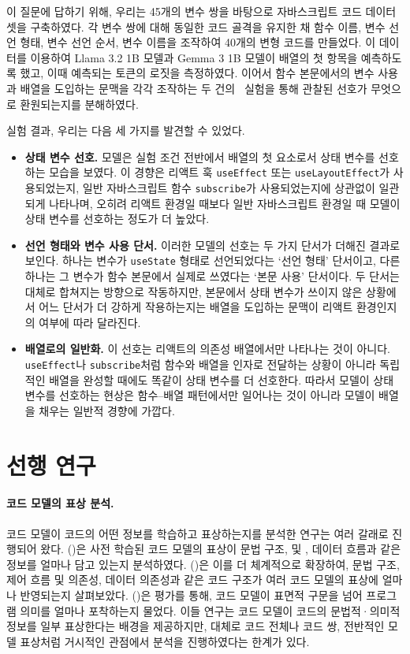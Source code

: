 \documentclass[11pt]{article}
\renewcommand{\citet}[1]{\citeauthor{#1}(\citeyear{#1})}
\begin{document}
이 질문에 답하기 위해, 우리는 45개의 변수 쌍을 바탕으로 자바스크립트 코드 데이터셋을 구축하였다.
각 변수 쌍에 대해 동일한 코드 골격을 유지한 채 함수 이름, 변수 선언 형태, 변수 선언 순서, 변수 이름을 조작하여 40개의 변형 코드를 만들었다.
이 데이터를 이용하여 Llama 3.2 1B 모델과 Gemma 3 1B 모델이 배열의 첫 항목을 예측하도록 했고, 이때 예측되는 토큰의 로짓을 측정하였다.
이어서 함수 본문에서의 변수 사용과 배열을 도입하는 문맥을 각각 조작하는 두 건의 ~실험을 통해 관찰된 선호가 무엇으로 환원되는지를 분해하였다.

실험 결과, 우리는 다음 세 가지를 발견할 수 있었다.
\begin{itemize}
  \item \textbf{상태 변수 선호.}
    모델은 실험 조건 전반에서 배열의 첫 요소로서 상태 변수를 선호하는 모습을 보였다.
    이 경향은 리액트 훅 \texttt{useEffect} 또는 \texttt{useLayoutEffect}가 사용되었는지, 일반 자바스크립트 함수 \texttt{subscribe}가 사용되었는지에 상관없이 일관되게 나타나며, 오히려 리액트 환경일 때보다 일반 자바스크립트 환경일 때 모델이 상태 변수를 선호하는 정도가 더 높았다.
  \item \textbf{선언 형태와 변수 사용 단서.}
    이러한 모델의 선호는 두 가지 단서가 더해진 결과로 보인다.
    하나는 변수가 \texttt{useState} 형태로 선언되었다는 `선언 형태' 단서이고, 다른 하나는 그 변수가 함수 본문에서 실제로 쓰였다는 `본문 사용' 단서이다.
    두 단서는 대체로 합쳐지는 방향으로 작동하지만, 본문에서 상태 변수가 쓰이지 않은 상황에서 어느 단서가 더 강하게 작용하는지는 배열을 도입하는 문맥이 리액트 환경인지의 여부에 따라 달라진다.
  \item \textbf{배열로의 일반화.}
    이 선호는 리액트의 의존성 배열에서만 나타나는 것이 아니다.
    \texttt{useEffect}나 \texttt{subscribe}처럼 함수와 배열을 인자로 전달하는 상황이 아니라 독립적인 배열을 완성할 때에도 똑같이 상태 변수를 더 선호한다.
    따라서 모델이 상태 변수를 선호하는 현상은 함수--배열 패턴에서만 일어나는 것이 아니라 모델이 배열을 채우는 일반적 경향에 가깝다.
\end{itemize}

\section{선행 연구}
\label{sec:related}

\paragraph{코드 모델의 표상 분석.}
코드 모델이 코드의 어떤 정보를 학습하고 표상하는지를 분석한 연구는 여러 갈래로 진행되어 왔다.
\citet{troshin2022probing}은 사전 학습된 코드 모델의 표상이 문법 구조,  및 , 데이터 흐름과 같은 정보를 얼마나 담고 있는지 분석하였다.
\citet{ma2024unveiling}은 이를 더 체계적으로 확장하여, 문법 구조, 제어 흐름 및 의존성, 데이터 의존성과 같은 코드 구조가 여러 코드 모델의 표상에 얼마나 반영되는지 살펴보았다.
\citet{maveli2025functional}은  평가를 통해, 코드 모델이 표면적 구문을 넘어 프로그램 의미를 얼마나 포착하는지 물었다.
이들 연구는 코드 모델이 코드의 문법적·의미적 정보를 일부 표상한다는 배경을 제공하지만, 대체로 코드 전체나 코드 쌍, 전반적인 모델 표상처럼 거시적인 관점에서 분석을 진행하였다는 한계가 있다.
\end{document}
